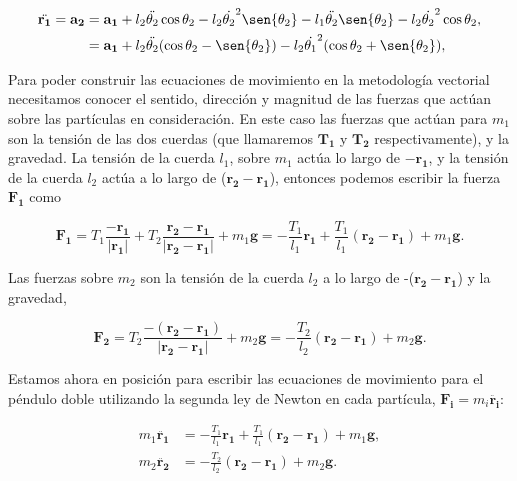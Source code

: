 \documentclass[a4paper,10pt]{article}
\numberwithin{equation}{section}
\begin{document}
\begin{align}
\begin{split}
 \ddot{\mathbf{r_1}} = \mathbf{a_2} &= \mathbf{a_1} + l_2 \ddot{\theta_2} \cos{\theta_2} - l_2 \dot{\theta_2}^2 \sen{\theta_2} - l_1 \ddot{\theta_2} \sen{\theta_2} - l_2 \dot{\theta_2}^2 \cos{\theta_2}, \\
 &= \mathbf{a_1} + l_2 \ddot{\theta_2} (\cos{\theta_2} - \sen{\theta_2}) - l_2 \dot{\theta_1}^2 (\cos{\theta_2} +  \sen{\theta_2}),
 \label{eq:pendu6}
\end{split}
\end{align}

Para poder construir las ecuaciones de movimiento en la metodología vectorial necesitamos 
conocer el sentido, dirección y magnitud de las fuerzas que actúan sobre las partículas 
en consideración. En este caso las fuerzas que actúan para $m_1$ son la tensión de las 
dos cuerdas (que llamaremos $\mathbf{T_1}$ y $\mathbf{T_2}$ respectivamente), y la gravedad.
La tensión de la cuerda $l_1$, sobre $m_1$ actúa lo largo de $-\mathbf{r_1}$, y la tensión 
de la cuerda $l_2$ actúa a lo largo de ($\mathbf{r_2} - \mathbf{r_1}$), entonces podemos 
escribir la fuerza $\mathbf{F_1}$ como

\begin{equation}
 \mathbf{F_1} = T_1 \frac{-\mathbf{r_1}}{|\mathbf{r_1}|} + T_2 \frac{\mathbf{r_2} - \mathbf{r_1}}{|\mathbf{r_2} -\mathbf{r_1}|}
	      + m_1 \mathbf{g} = - \frac{T_1}{l_1} \mathbf{r_1} + \frac{T_1}{l_1} (\mathbf{r_2} - \mathbf{r_1}) + m_1 \mathbf{g}.
\end{equation}

Las fuerzas sobre $m_2$ son la tensión de la cuerda $l_2$ a lo largo de -($\mathbf{r_2} - \mathbf{r_1}$)
y la gravedad,

\begin{equation}
 \mathbf{F_2} = T_2 \frac{-(\mathbf{r_2} - \mathbf{r_1})}{|\mathbf{r_2} -\mathbf{r_1}|}
	      + m_2 \mathbf{g} = - \frac{T_2}{l_2} (\mathbf{r_2} -\mathbf{r_1}) + m_2 \mathbf{g}.
\end{equation}

Estamos ahora en posición para escribir las ecuaciones de movimiento para el péndulo 
doble utilizando la segunda ley de Newton en cada partícula, $\mathbf{F_i} = m_i \ddot{\mathbf{r_i}}$:

\begin{align}
 m_1 \ddot{\mathbf{r_1}} &= - \frac{T_1}{l_1} \mathbf{r_1} + \frac{T_1}{l_1} (\mathbf{r_2} - \mathbf{r_1}) + m_1 \mathbf{g}, \\
 m_2 \ddot{\mathbf{r_2}} &= - \frac{T_2}{l_2} (\mathbf{r_2} -\mathbf{r_1}) + m_2 \mathbf{g}.
\end{align}
\end{document}
